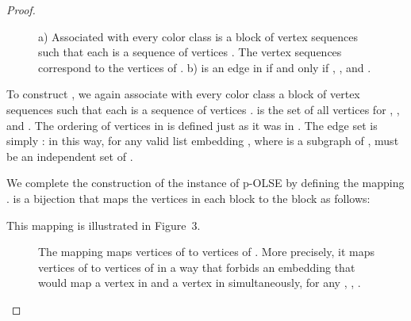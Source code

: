 \documentclass[11pt]{article}
\begin{document}
\begin{proof}
\begin{figure}
\caption{a) Associated with every color class  is a block  of vertex
sequences  such that each  is a sequence of 
vertices . The vertex sequences 
correspond to the  vertices of . b) 
is an edge in  if and only if , ,
and .}
\end{figure}


To construct , we again associate with every color class
 a block  of vertex sequences  such that each
 is a sequence of  vertices .
 is the set of all vertices  for ,
, and . The ordering  of vertices
in  is defined just as it was in .
The edge set  is simply : in this way, for any valid list embedding
, where  is a subgraph of ,  must be an independent
set of .

We complete the construction of the instance of p-\textsc{OLSE} by defining
the mapping .  is a bijection that maps the vertices in each block
 to the block  as follows:

This mapping is illustrated in Figure~3.

\begin{figure}
\label{fi:map}
\caption{The mapping  maps vertices of  to vertices of . More
precisely, it maps vertices of  to vertices of  in a way
that forbids an embedding that would map a vertex in  and a vertex in
 simultaneously, for any , , .}
\end{figure}



\end{proof}
\end{document}
